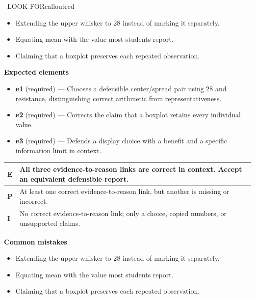 \documentclass[11pt]{article}
\begin{document}
\begin{callout}{\IconWarn\ LOOK FOR}{calloutred}
\begin{itemize}[leftmargin=1.5em,itemsep=2pt,topsep=2pt]
  \item Extending the upper whisker to 28 instead of marking it separately.
  \item Equating mean with the value most students report.
  \item Claiming that a boxplot preserves each repeated observation.
\end{itemize}
\end{callout}


\textbf{Expected elements}
\begin{itemize}[leftmargin=1.5em,itemsep=2pt,topsep=2pt]
  \item \textbf{e1} (required) --- Chooses a defensible center/spread pair using 28 and resistance, distinguishing correct arithmetic from representativeness.
  \item \textbf{e2} (required) --- Corrects the claim that a boxplot retains every individual value.
  \item \textbf{e3} (required) --- Defends a display choice with a benefit and a specific information limit in context.
\end{itemize}

{\small\renewcommand{\arraystretch}{1.25}
\noindent\begin{tabular}{|p{0.5in}|p{5.9in}|}
\hline
\textbf{E} & All three evidence-to-reason links are correct in context. Accept an equivalent defensible report. \\ \hline
\textbf{P} & At least one correct evidence-to-reason link, but another is missing or incorrect. \\ \hline
\textbf{I} & No correct evidence-to-reason link; only a choice, copied numbers, or unsupported claims. \\ \hline
\end{tabular}}

\textbf{Common mistakes}
\begin{itemize}[leftmargin=1.5em,itemsep=2pt,topsep=2pt]
  \item Extending the upper whisker to 28 instead of marking it separately.
  \item Equating mean with the value most students report.
  \item Claiming that a boxplot preserves each repeated observation.
\end{itemize}
\end{document}
